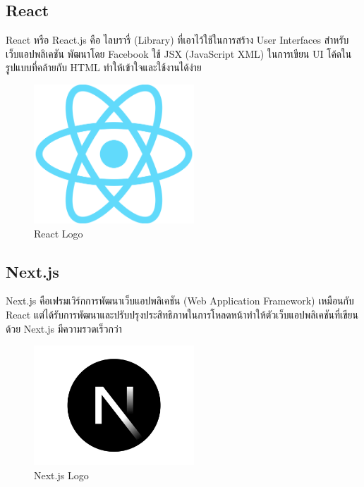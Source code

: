 

\subsection{React}

React หรือ React.js คือ ไลบรารี่ (Library) ที่เอาไว้ใช้ในการสร้าง User Interfaces สำหรับเว็บแอปพลิเคชัน พัฒนาโดย Facebook ใช้ JSX (JavaScript XML) ในการเขียน UI โค้ดในรูปแบบที่คล้ายกับ HTML ทำให้เข้าใจและใช้งานได้ง่าย \cite{ReadyToReactWithJSX}

\begin{figure}[H]
    \centering
    \includegraphics[width=60mm,scale=1.0]{images/react.png}
    \caption{React Logo}
    \label{fig:react}
\end{figure}

\subsection{Next.js}

Next.js คือเฟรมเวิร์กการพัฒนาเว็บแอปพลิเคชัน (Web Application Framework) เหมือนกับ React แต่ได้รับการพัฒนาและปรับปรุงประสิทธิภาพในการโหลดหน้าทำให้ตัวเว็บแอปพลิเคชันที่เขียนด้วย Next.js มีความรวดเร็วกว่า \cite{WhatIsNextjs}

\begin{figure}[H]
    \centering
    \includegraphics[width=60mm,scale=1.0]{images/nextjs.png}
    \caption{Next.js Logo}
    \label{fig:nextjs}
\end{figure}

